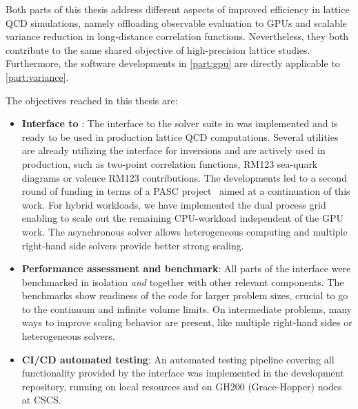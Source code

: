 
Both parts of this thesis address different aspects of improved efficiency in lattice QCD simulations, namely offloading observable evaluation to GPUs and scalable variance reduction in long-distance correlation functions.
Nevertheless, they both contribute to the same shared objective of high-precision lattice studies.
Furthermore, the software developments in \cref{part:gpu} are directly applicable to \cref{part:variance}.

The objectives reached in this thesis are: 
\begin{itemize}
   \item \textbf{Interface to \quda}: The interface to the solver suite in \quda was implemented and is ready to be used in production lattice QCD computations. Several utilities are already utilizing the interface for inversions and are actively used in production, such as two-point correlation functions, RM123 sea-quark diagrams or valence RM123 contributions. The developments led to a second round of funding in terms of a PASC project~\cite{online:pasc2025} aimed at a continuation of this work. For hybrid workloads, we have implemented the dual process grid enabling to scale out the remaining CPU-workload independent of the GPU work. The asynchronous solver allows heterogeneous computing and multiple right-hand side solvers provide better strong scaling.
   \item \textbf{Performance assessment and benchmark}: All parts of the interface were benchmarked in isolation \emph{and} together with other relevant components. The benchmarks show readiness of the code for larger problem sizes, crucial to go to the continuum and infinite volume limits. On intermediate problems, many ways to improve scaling behavior are present, like multiple right-hand sides or heterogeneous solvers.
   \item \textbf{CI/CD automated testing}: An automated testing pipeline covering all functionality provided by the interface was implemented in the development repository, running on local resources and on GH200 (Grace-Hopper) nodes at CSCS.

\end{itemize}
